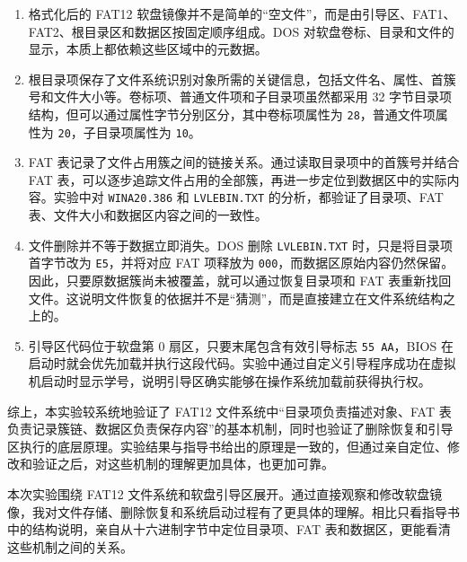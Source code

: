 \documentclass[12pt]{ctexart}
\begin{document}
\begin{enumerate}
    \item 格式化后的 FAT12 软盘镜像并不是简单的“空文件”，而是由引导区、FAT1、FAT2、根目录区和数据区按固定顺序组成。DOS 对软盘卷标、目录和文件的显示，本质上都依赖这些区域中的元数据。
    
    \item 根目录项保存了文件系统识别对象所需的关键信息，包括文件名、属性、首簇号和文件大小等。卷标项、普通文件项和子目录项虽然都采用 32 字节目录项结构，但可以通过属性字节分别区分，其中卷标项属性为 \texttt{28}，普通文件项属性为 \texttt{20}，子目录项属性为 \texttt{10}。
    
    \item FAT 表记录了文件占用簇之间的链接关系。通过读取目录项中的首簇号并结合 FAT 表，可以逐步追踪文件占用的全部簇，再进一步定位到数据区中的实际内容。实验中对 \texttt{WINA20.386} 和 \texttt{LVLEBIN.TXT} 的分析，都验证了目录项、FAT 表、文件大小和数据区内容之间的一致性。
    
    \item 文件删除并不等于数据立即消失。DOS 删除 \texttt{LVLEBIN.TXT} 时，只是将目录项首字节改为 \texttt{E5}，并将对应 FAT 项释放为 \texttt{000}，而数据区原始内容仍然保留。因此，只要原数据簇尚未被覆盖，就可以通过恢复目录项和 FAT 表重新找回文件。这说明文件恢复的依据并不是“猜测”，而是直接建立在文件系统结构之上的。
    
    \item 引导区代码位于软盘第 0 扇区，只要末尾包含有效引导标志 \texttt{55 AA}，BIOS 在启动时就会优先加载并执行这段代码。实验中通过自定义引导程序成功在虚拟机启动时显示学号，说明引导区确实能够在操作系统加载前获得执行权。
\end{enumerate}

综上，本实验较系统地验证了 FAT12 文件系统中“目录项负责描述对象、FAT 表负责记录簇链、数据区负责保存内容”的基本机制，同时也验证了删除恢复和引导区执行的底层原理。实验结果与指导书给出的原理是一致的，但通过亲自定位、修改和验证之后，对这些机制的理解更加具体，也更加可靠。



    \vspace{1.2cm}

\vspace{0.8cm}

本次实验围绕 FAT12 文件系统和软盘引导区展开。通过直接观察和修改软盘镜像，我对文件存储、删除恢复和系统启动过程有了更具体的理解。相比只看指导书中的结构说明，亲自从十六进制字节中定位目录项、FAT 表和数据区，更能看清这些机制之间的关系。
\end{document}
